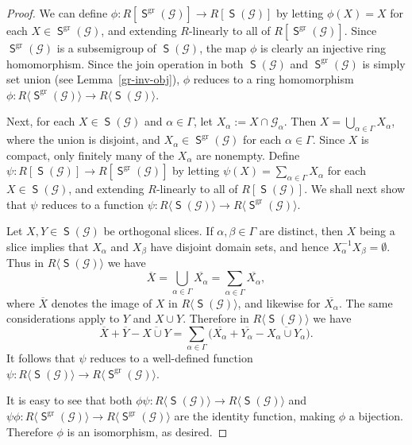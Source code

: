 \documentclass[a4paper,reqno,12pt]{amsart}
\numberwithin{equation}{section}
\theoremstyle{plain}
\theoremstyle{definition}
\newcommand{\gr}{\operatorname{gr}}
\newcommand{\SG}{\operatorname{\mathsf{S}}}
\begin{document}
\begin{proof}
We can define $\phi: R[\SG^{\gr}(\mathscr{G})] \rightarrow R[\SG(\mathscr{G})]$ by letting $\phi (X) = X$ for each $X \in \SG^{\gr}(\mathscr{G})$, and extending $R$-linearly to all of $R[\SG^{\gr}(\mathscr{G})]$. Since $\SG^{\gr}(\mathscr{G})$ is a subsemigroup of $\SG(\mathscr{G})$, the map $\phi$ is clearly an injective ring homomorphism. Since the join operation in both $\SG(\mathscr{G})$ and $\SG^{\gr}(\mathscr{G})$ is simply set union (see Lemma~\ref{gr-inv-obj}), $\phi$ reduces to a ring homomorphism $\phi: R\langle \SG^{\gr}(\mathscr{G}) \rangle \rightarrow R\langle \SG(\mathscr{G}) \rangle$.

Next, for each $X \in \SG(\mathscr{G})$ and $\alpha \in \Gamma$, let $X_{\alpha} :=X\cap \mathscr{G}_{\alpha}$. Then $X=\bigcup_{\alpha \in \Gamma} X_{\alpha}$, where the union is disjoint, and $X_{\alpha} \in \SG^{\gr}(\mathscr{G})$ for each $\alpha \in \Gamma$. Since $X$ is compact, only finitely many of the $X_{\alpha}$ are nonempty. Define $\psi: R[\SG(\mathscr{G})] \rightarrow R[\SG^{\gr}(\mathscr{G})]$ by letting $\psi(X) = \sum _{\alpha \in \Gamma} X_{\alpha}$ for each $X \in \SG(\mathscr{G})$, and extending $R$-linearly to all of $R[\SG(\mathscr{G})]$. We shall next show that $\psi$ reduces to a function $\psi: R\langle \SG(\mathscr{G}) \rangle \rightarrow R\langle \SG^{\gr}(\mathscr{G}) \rangle$.

Let $X,Y \in \SG(\mathscr{G})$ be orthogonal slices. If $\alpha, \beta \in \Gamma$ are distinct, then $X$ being a slice implies that $X_{\alpha}$ and $X_{\beta}$ have disjoint domain sets, and hence $X_{\alpha}^{-1}X_{\beta}=\emptyset$. Thus in $R\langle \SG(\mathscr{G}) \rangle$ we have 
\[\overline{X} = \bigcup_{\alpha \in \Gamma} \overline{X_{\alpha}} =\sum_{\alpha \in \Gamma} \overline{X_{\alpha}},\] where $\overline{X}$ denotes the image of $X$ in $R\langle \SG(\mathscr{G}) \rangle$, and likewise for $\overline{X_{\alpha}}$. The same considerations apply to $Y$ and $X\cup Y$. Therefore in $R\langle \SG(\mathscr{G}) \rangle$ we have
\[\overline{X}+ \overline{Y}-\overline{X\cup Y}=\sum_{\alpha\in \Gamma} \big(\overline{X_{\alpha}}+ \overline{Y_{\alpha}}-\overline{X_{\alpha}\cup Y_{\alpha}}\big).\] 
It follows that $\psi$ reduces to a well-defined function $\psi: R\langle \SG(\mathscr{G}) \rangle \rightarrow R\langle \SG^{\gr}(\mathscr{G}) \rangle$.

It is easy to see that both $\phi\psi: R\langle \SG(\mathscr{G}) \rangle \rightarrow R\langle \SG(\mathscr{G}) \rangle$ and $\psi\phi: R\langle \SG^{\gr}(\mathscr{G}) \rangle \rightarrow R\langle \SG^{\gr}(\mathscr{G}) \rangle$ are the identity function, making $\phi$ a bijection. Therefore $\phi$ is an isomorphism, as desired.
\end{proof}
\end{document}
